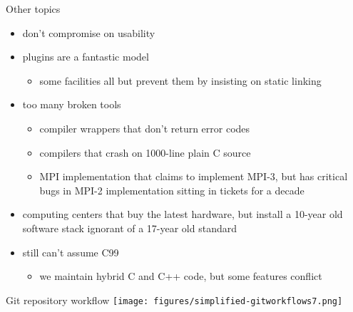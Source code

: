 \documentclass{beamer}
\begin{document}
\begin{frame}{Other topics}
  \begin{itemize}
  \item don't compromise on usability
  \item plugins are a fantastic model
    \begin{itemize}
    \item some facilities all but prevent them by insisting on static linking
    \end{itemize}
  \item too many broken tools
    \begin{itemize}
    \item compiler wrappers that don't return error codes
    \item compilers that crash on 1000-line plain C source
    \item MPI implementation that claims to implement MPI-3, but has critical bugs in MPI-2 implementation sitting in tickets for a decade
    \end{itemize}
  \item computing centers that buy the latest hardware, but install a 10-year old software stack ignorant of a 17-year old standard
  \item still can't assume C99
    \begin{itemize}
    \item we maintain hybrid C and C++ code, but some features conflict
    \end{itemize}
  \end{itemize}
\end{frame}

\begin{frame}{Git repository workflow}
  \texttt{[image: figures/simplified-gitworkflows7.png]}
\end{frame}
\end{document}
